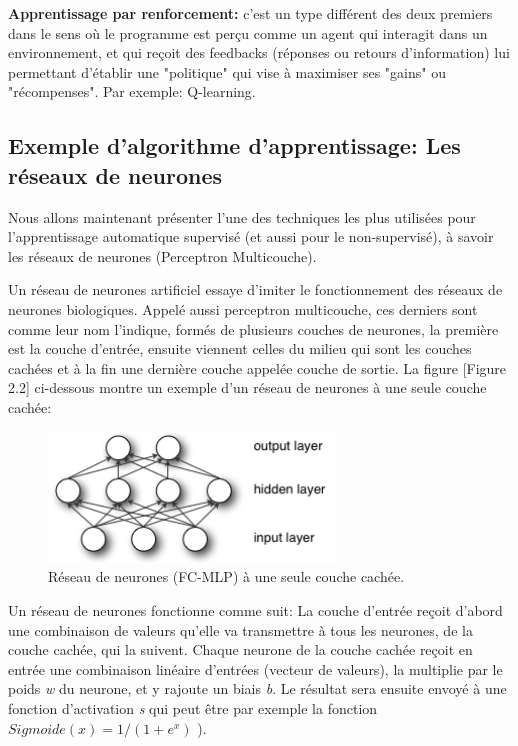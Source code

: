 \textbf{Apprentissage par renforcement:} c'est un type différent des deux premiers dans le sens où le programme est perçu comme un agent qui interagit dans un environnement, et qui reçoit des feedbacks (réponses ou retours d'information) lui permettant d’établir une "politique" qui vise à maximiser ses "gains" ou "récompenses". Par exemple: Q-learning.\\


\subsection{Exemple d'algorithme d'apprentissage: Les réseaux de neurones}
	
	Nous allons maintenant présenter l'une des techniques les plus utilisées pour l'apprentissage automatique supervisé (et aussi pour le non-supervisé), à savoir les réseaux de neurones (Perceptron Multicouche).
	
	Un réseau de neurones artificiel essaye d'imiter le fonctionnement des réseaux de neurones biologiques. Appelé aussi perceptron multicouche, ces derniers sont comme leur nom l'indique, formés de plusieurs couches de neurones, la première est la couche d'entrée, ensuite viennent celles du milieu qui sont les couches cachées et à la fin une dernière couche appelée couche de sortie. La figure [Figure 2.2] ci-dessous montre un exemple d'un réseau de neurones à une seule couche cachée:


\begin{figure}[H]
	\centering
		\includegraphics[width=3in]{Figures/mlp.png}
	\caption[An Electron]{Réseau de neurones (FC-MLP) à une seule couche cachée.}
	\label{fig:Electron}
\end{figure}

	Un réseau de neurones fonctionne comme suit: La couche d'entrée reçoit d'abord une combinaison de valeurs qu'elle va transmettre à tous les neurones, de la couche cachée, qui la suivent. Chaque neurone de la couche cachée reçoit en entrée une combinaison linéaire d'entrées (vecteur de valeurs), la multiplie par le poids \textit{w} du neurone, et y rajoute un biais \textit{b}. Le résultat sera ensuite envoyé à une fonction d'activation \textit{s} qui peut être par exemple la fonction $Sigmoide(x) = 1/(1+e^{x})$ ).
	
